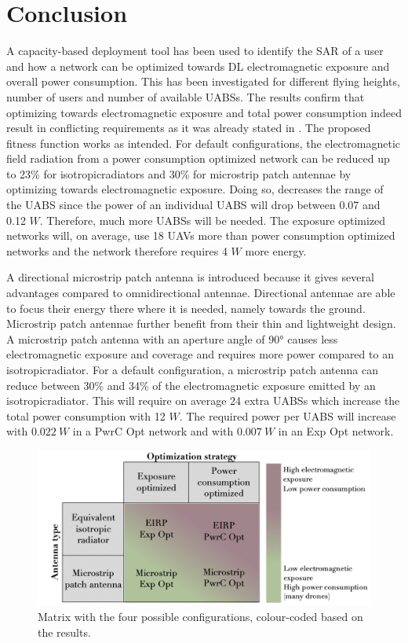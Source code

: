 \documentclass[twocolumn]{phdsymp} %
\begin{document}
\section{Conclusion}

A capacity-based deployment tool has been used to identify the \gls{SAR} of a user and how a network can be optimized 
towards \gls{DL} electromagnetic exposure and overall power consumption. This has been investigated for different flying heights,
number of users and number of available \gls{UABS}s.
The  results confirm that optimizing towards electromagnetic exposure and total power consumption indeed result in 
conflicting requirements as it was already stated in  \cite{J1}. The proposed fitness function works as intended. 
For default configurations, the electromagnetic field radiation from a
power consumption optimized network can be reduced up to 23\% for \gls{isotropicradiator}s and 30\% for microstrip patch antennae 
by optimizing towards electromagnetic exposure. 
Doing so, decreases the range of the \gls{UABS}  since the power of an individual \gls{UABS} will 
drop between 0.07 and 0.12 $W$. Therefore, much more \gls{UABS}s will be needed. 
The exposure optimized networks will, on average, use 18 \gls{UAV}s more than power consumption optimized networks
and the network therefore requires 4 $W$ more energy.

A directional microstrip patch antenna is introduced because it gives several advantages compared to omnidirectional antennae.
Directional antennae are able to focus their energy there where it is needed, namely towards the ground. Microstrip patch antennae 
further benefit from their thin and lightweight design. 
A microstrip patch antenna with an aperture  angle of \ang{90} causes less electromagnetic exposure and coverage and requires more power compared to an \gls{isotropicradiator}.
For a default configuration, a microstrip patch antenna can reduce between 30\% and 34\% of the electromagnetic exposure 
emitted by an \gls{isotropicradiator}. This will require on average 24 extra \gls{UABS}s 
which increase the total power consumption with 12 $W$. The required power per \gls{UABS} will increase with $0.022\ W$ 
in a \gls{PwrC Opt} network and with $0.007\ W$ in an \gls{Exp Opt} network.
\begin{figure}[hb!]
\centering
  \includegraphics[width=0.8\linewidth]{../images/fourCasesMatrixSol.png}
  \caption{Matrix with the four possible configurations, colour-coded based on the results.}
  \label{fig:resultIllustration}
\end{figure}
\end{document}
